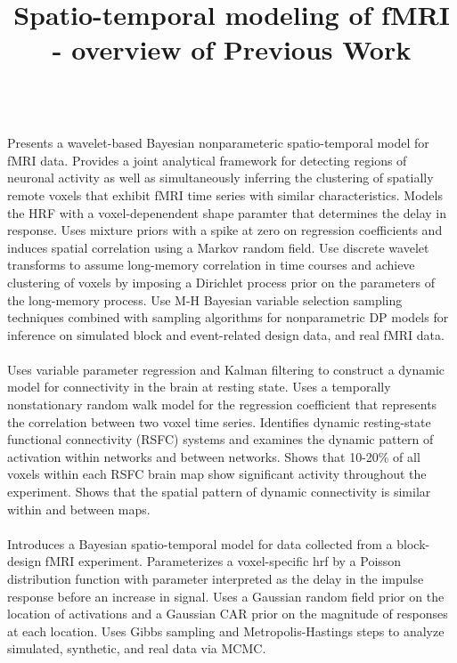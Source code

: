 \documentclass{article}
\title{Spatio-temporal modeling of fMRI - overview of Previous Work}
\begin{document}
\maketitle

 \\
\noindent Presents a wavelet-based Bayesian nonparameteric spatio-temporal model for fMRI data. Provides a joint analytical framework for detecting regions of neuronal activity as well as simultaneously inferring the clustering of spatially remote voxels that exhibit fMRI time series with similar characteristics. Models the HRF with a voxel-depenendent shape paramter that determines the delay in response. Uses mixture priors with a spike at zero on regression coefficients and induces spatial correlation using a Markov random field. Use discrete wavelet transforms to assume long-memory correlation in time courses and achieve clustering of voxels by imposing a Dirichlet process prior on the parameters of the long-memory process. Use M-H Bayesian variable selection sampling techniques combined with sampling algorithms for nonparametric DP models for inference on simulated block and event-related design data, and real fMRI data. \\

 \\
\noindent Uses variable parameter regression and Kalman filtering to construct a dynamic model for connectivity in the brain at resting state. Uses a temporally nonstationary random walk model for the regression coefficient that represents the correlation between two voxel time series. Identifies dynamic resting-state functional connectivity (RSFC) systems and examines the dynamic pattern of activation within networks and between networks. Shows that 10-20\% of all voxels within each RSFC brain map show significant activity throughout the experiment. Shows that the spatial pattern of dynamic connectivity is similar within and between maps. \\

 \\
\noindent Introduces a Bayesian spatio-temporal model for data collected from a block-design fMRI experiment. Parameterizes a voxel-specific hrf by a Poisson distribution function with parameter interpreted as the delay in the impulse response before an increase in signal. Uses a Gaussian random field prior on the location of activations and a Gaussian CAR prior on the magnitude of responses at each location. Uses Gibbs sampling and Metropolis-Hastings steps to analyze simulated, synthetic, and real data via MCMC.
\end{document}
